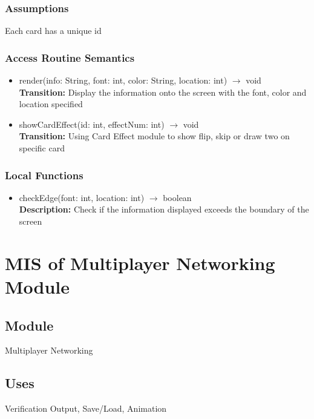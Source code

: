 \documentclass[12pt, titlepage]{article}
\begin{document}
\subsubsection{Assumptions}
\hspace{1.5em}Each card has a unique id


\subsubsection{Access Routine Semantics}

\begin{itemize}
\item render(info: String, font: int, color: String, location: int)
$\rightarrow$ void\\
\textbf{Transition:} Display the information onto the screen with the font, color and location specified

\item showCardEffect(id: int, effectNum: int) $\rightarrow$ void\\
\textbf{Transition:} Using Card Effect module to show flip, skip or draw two on specific card 	

\end{itemize}


\subsubsection{Local Functions}
\begin{itemize}
\item checkEdge(font: int, location: int) $\rightarrow$ boolean\\
\textbf{Description:} Check if the information displayed exceeds the boundary of the screen
\end{itemize}


\section{MIS of Multiplayer Networking Module} 

\subsection{Module}
\hspace{1.5em}Multiplayer Networking

\subsection{Uses}
\hspace{1.5em}Verification Output, Save/Load, Animation
\end{document}
